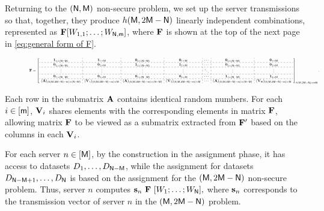 \documentclass[conference,letterpaper]{IEEEtran}
\begin{document}
Returning to the \( ({\sf N}, {\sf M}) \) non-secure problem, we set up the server transmissions so that, together, they produce \( h({\sf M}, 2{\sf M} - {\sf N}) \) linearly independent combinations, represented as \( {\bf F} [W_{1,1}; \ldots; W_{{\sf N}, {\sf m}}] \), where \( {\bf F} \) is shown at the top of the next page in \eqref{eq:general form of F}.
\begin{figure}[ht]
\begin{equation}
\resizebox{\textwidth}{!}{$ %
{\bf F} = 
\left[
\begin{array}{c:c:c:c:c:c:c}
{\bf 1}_{1 \times (\Nsf - \Msf)} & {\bf 1}_{1 \times \Msf} & {\bf 0}_{1 \times (\Nsf - \Msf)} & {\bf 0}_{1 \times \Msf} & \cdots & {\bf 0}_{1 \times (\Nsf - \Msf)} & {\bf 0}_{1 \times \Msf} \\ \hdashline
{\bf 0}_{1 \times (\Nsf - \Msf)} & {\bf 0}_{1 \times \Msf} & {\bf 1}_{1 \times (\Nsf - \Msf)} & {\bf 1}_{1 \times \Msf} & \cdots & {\bf 0}_{1 \times (\Nsf - \Msf)} & {\bf 0}_{1 \times \Msf} \\ \hdashline 
\vdots & \vdots & \vdots & \vdots & \ddots & \vdots & \vdots \\ \hdashline
{\bf 0}_{1 \times (\Nsf - \Msf)} & {\bf 0}_{1 \times \Msf} & {\bf 0}_{1 \times (\Nsf - \Msf)} & {\bf 0}_{1 \times \Msf} & \cdots & {\bf 1}_{1 \times (\Nsf - \Msf)} & {\bf 1}_{1 \times \Msf} \\ \hdashline
({\bf A})_{(h(\Msf, 2\Msf-\Nsf) - \msf) \times (\Nsf - \Msf)} & ({\bf V}_{1})_{(h(\Msf, 2\Msf-\Nsf) - \msf) \times \Msf} & ({\bf A})_{(h(\Msf, 2\Msf-\Nsf) - \msf) \times (\Nsf - \Msf)} & ({\bf V}_{2})_{(h(\Msf, 2\Msf-\Nsf) - \msf) \times \Msf} & \cdots & ({\bf A})_{(h(\Msf, 2\Msf-\Nsf) - \msf) \times (\Nsf - \Msf)} & ({\bf V}_{\msf})_{(h(\Msf, 2\Msf-\Nsf) - \msf) \times \Msf}
\end{array}
\right]_{h(\Msf, 2\Msf - \Nsf) \times \msf \Nsf}.$}
\label{eq:general form of F}
\end{equation}

\end{figure}
Each row in the submatrix ${\bf A}$ contains identical random numbers. For each $i \in [{\sf m}]$, ${\bf V}_i$ shares elements with the corresponding elements in matrix ${\bf F}$, allowing matrix ${\bf F}$ to be viewed as a submatrix extracted from ${\bf F}'$ based on the columns in each ${\bf V}_i$.

For each server $n \in [{\sf M}]$, by the construction in the assignment phase, it has access to datasets $D_1, \ldots, D_{{\sf N} - {\sf M}}$, while the assignment for datasets $D_{{\sf N} - {\sf M} + 1}, \ldots, D_{{\sf N}}$ is based on the assignment for the $({\sf M}, 2{\sf M} - {\sf N})$ non-secure problem. Thus, server $n$ computes
$ 
{\bf s}_{n} \ {\bf F} \ [W_1; \ldots; W_{{\sf N}}],
$
where ${\bf s}_n$ corresponds to the transmission vector of server $n$ in the $({\sf M}, 2{\sf M} - {\sf N})$ problem.
\end{document}
